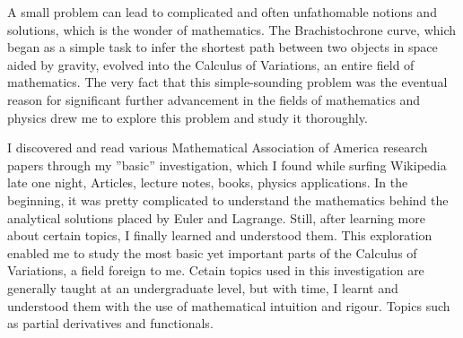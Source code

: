 






{A small problem can lead to complicated and often unfathomable notions and solutions, which is the wonder of mathematics. The Brachistochrone curve, which began as a simple task to infer the shortest path between two objects in space aided by gravity, evolved into the Calculus of Variations, an entire field of mathematics. The very fact that this simple-sounding problem was the eventual reason for significant further advancement in the fields of mathematics and physics drew me to explore this problem and study it thoroughly.} 

{I discovered and read various Mathematical Association of America research papers through my ”basic” investigation, which I found while surfing Wikipedia late one night, Articles, lecture notes, books, physics applications. In the beginning, it was pretty complicated to understand the mathematics behind the analytical solutions placed by Euler and Lagrange. Still, after learning more about certain topics, I finally learned and understood them. This exploration enabled me to study the most basic yet important parts of the Calculus of Variations, a field foreign to me. Cetain topics used in this investigation are generally taught at an undergraduate level, but with time, I learnt and understood them with the use of mathematical intuition and rigour. Topics such as partial derivatives and functionals.} 

